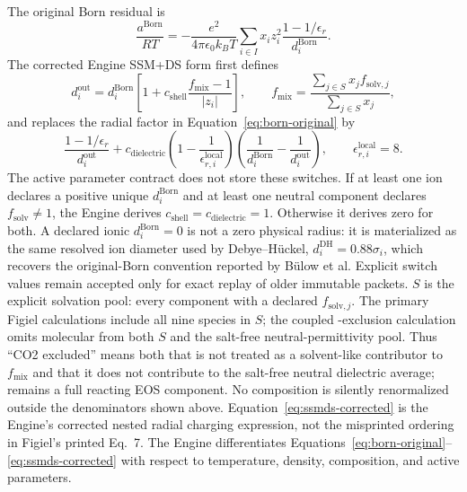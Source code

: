 \documentclass[10pt,oneside]{scrartcl}
\begin{document}
The original Born residual is
\begin{equation}
\frac{a^{\mathrm{Born}}}{RT}=-\frac{e^2}{4\pi\epsilon_0k_BT}
\sum_{i\in I}x_i z_i^2\frac{1-1/\epsilon_r}{d_i^{\mathrm{Born}}}.
\label{eq:born-original}
\end{equation}
The corrected Engine SSM+DS form first defines
\begin{equation}
d_i^{\mathrm{out}}=d_i^{\mathrm{Born}}
\left[1+c_{\mathrm{shell}}\frac{f_{\mathrm{mix}}-1}{|z_i|}\right],
\qquad f_{\mathrm{mix}}=
\frac{\sum_{j\in S}x_jf_{\mathrm{solv},j}}{\sum_{j\in S}x_j},
\end{equation}
and replaces the radial factor in Equation~\ref{eq:born-original} by
\begin{equation}
\frac{1-1/\epsilon_r}{d_i^{\mathrm{out}}}
+c_{\mathrm{dielectric}}\left(1-\frac{1}{\epsilon_{r,i}^{\mathrm{local}}}\right)
\left(\frac{1}{d_i^{\mathrm{Born}}}-\frac{1}{d_i^{\mathrm{out}}}\right),
\qquad \epsilon_{r,i}^{\mathrm{local}}=8.
\label{eq:ssmds-corrected}
\end{equation}
The active parameter contract does not store these switches. If at least one
ion declares a positive unique $d_i^{\mathrm{Born}}$ and at least one neutral
component declares $f_{\mathrm{solv}}\ne1$, the Engine derives
$c_{\mathrm{shell}}=c_{\mathrm{dielectric}}=1$. Otherwise it derives zero for
both. A declared ionic $d_i^{\mathrm{Born}}=0$ is not a zero physical radius:
it is materialized as the same resolved ion diameter used by Debye--H\"uckel,
$d_i^{\mathrm{DH}}=0.88\sigma_i$, which recovers the original-Born convention
reported by B\"ulow et al. Explicit switch values remain accepted only for
exact replay of older immutable packets.
$S$ is the explicit solvation pool: every component with a declared
$f_{\mathrm{solv},j}$. The primary Figiel calculations include all nine
species in $S$; the coupled -exclusion calculation omits molecular
 from both $S$ and the salt-free neutral-permittivity pool. Thus
``CO2 excluded'' means both that  is not treated as a solvent-like
contributor to $f_{\mathrm{mix}}$ and that it does not contribute to the
salt-free neutral dielectric average;  remains a full reacting EOS
component. No
composition is silently renormalized outside the denominators shown above.
Equation~\ref{eq:ssmds-corrected} is the Engine's corrected nested radial
charging expression, not the misprinted ordering in Figiel's printed Eq.~7.
The Engine differentiates Equations~\ref{eq:born-original}--
\ref{eq:ssmds-corrected} with respect to temperature, density, composition,
and active parameters.
\end{document}
